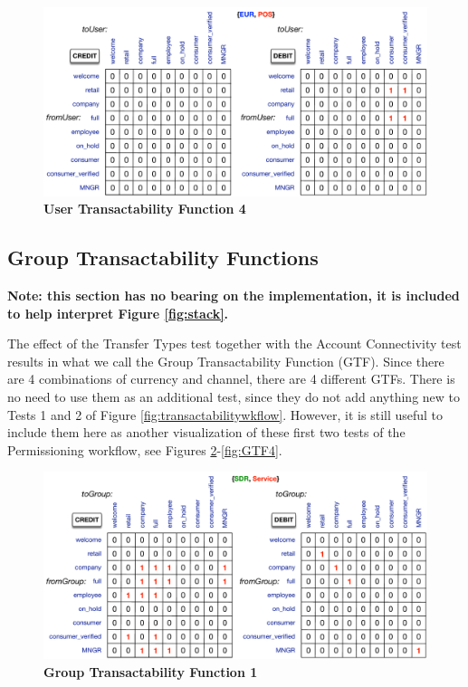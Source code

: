 \begin{figure}[H]
\centering
\includegraphics[width=17.5cm]{Figures/UTF4}
\caption{\small\textbf{User Transactability Function 4}}
\label{fig:UTF4}
\end{figure}



\subsection{Group Transactability Functions}
\textbf{\small Note: this section has no bearing on the implementation, it is included to help interpret Figure \ref{fig:stack}.}

The effect of the Transfer Types test together with the Account Connectivity test results in what we call the Group Transactability Function (GTF). Since there are 4 combinations of currency and channel, there are 4 different GTFs. There is no need to use them as an additional test, since they do not add anything new to Tests 1 and 2 of Figure \ref{fig:transactabilitywkflow}. However, it is still useful to include them here as another visualization of these first two tests of the Permissioning workflow, see Figures \ref{fig:GTF1}-\ref{fig:GTF4}.
\newpage

\vspace*{1cm}
\begin{figure}[h]
\centering
\includegraphics[width=17.5cm]{Figures/GTF1}
\caption{\small\textbf{Group Transactability Function 1}}
\label{fig:GTF1}
\end{figure}

